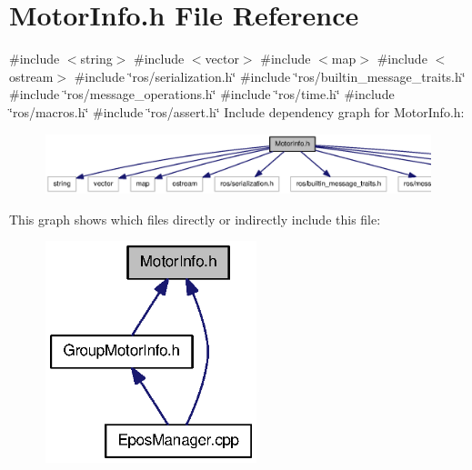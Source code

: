 \section{\-Motor\-Info.\-h \-File \-Reference}
\label{MotorInfo_8h}
{\ttfamily \#include $<$string$>$}\*
{\ttfamily \#include $<$vector$>$}\*
{\ttfamily \#include $<$map$>$}\*
{\ttfamily \#include $<$ostream$>$}\*
{\ttfamily \#include \char`\"{}ros/serialization.\-h\char`\"{}}\*
{\ttfamily \#include \char`\"{}ros/builtin\-\_\-message\-\_\-traits.\-h\char`\"{}}\*
{\ttfamily \#include \char`\"{}ros/message\-\_\-operations.\-h\char`\"{}}\*
{\ttfamily \#include \char`\"{}ros/time.\-h\char`\"{}}\*
{\ttfamily \#include \char`\"{}ros/macros.\-h\char`\"{}}\*
{\ttfamily \#include \char`\"{}ros/assert.\-h\char`\"{}}\*
\-Include dependency graph for \-Motor\-Info.\-h\-:
\nopagebreak
\begin{figure}[H]
\begin{center}
\leavevmode
\includegraphics[width=350pt]{MotorInfo_8h__incl}
\end{center}
\end{figure}
\-This graph shows which files directly or indirectly include this file\-:
\nopagebreak
\begin{figure}[H]
\begin{center}
\leavevmode
\includegraphics[width=174pt]{MotorInfo_8h__dep__incl}
\end{center}
\end{figure}

